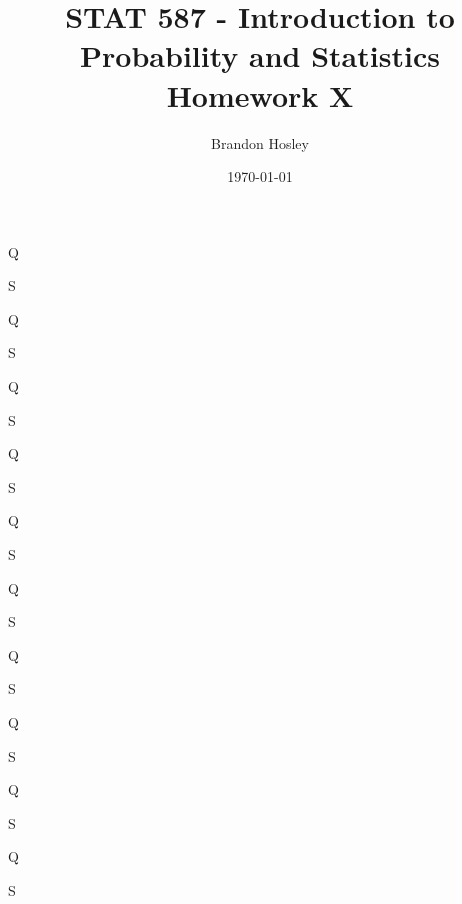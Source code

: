 \documentclass[answers]{exam}
\title{STAT 587 - Introduction to Probability and Statistics%
	\\ Homework X}
\author{Brandon Hosley}
\date{\today}
\begin{document}
\maketitle
\begin{questions}

\question 
Q
\begin{solution}
	S
\end{solution}

\question 
Q
\begin{solution}
	S
\end{solution}

\question 
Q
\begin{solution}
	S
\end{solution}

\question 
Q
\begin{solution}
	S
\end{solution}

\question 
Q
\begin{solution}
	S
\end{solution}

\question 
Q
\begin{solution}
	S
\end{solution}

\question 
Q
\begin{solution}
	S
\end{solution}

\question 
Q
\begin{solution}
	S
\end{solution}

\question 
Q
\begin{solution}
	S
\end{solution}

\question 
Q
\begin{solution}
	S
\end{solution}

\end{questions}
\end{document}
